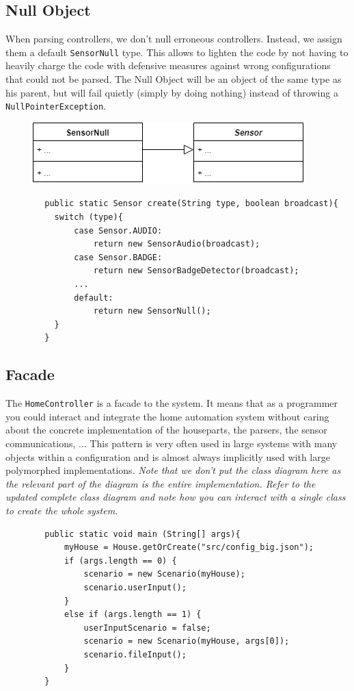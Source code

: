       \subsection{Null Object}
        When parsing controllers, we don't null erroneous controllers. Instead, we assign them a default \texttt{SensorNull} type. This allows to lighten the code by not having to heavily charge the code with defensive measures against wrong configurations that could not be parsed. The Null Object will be an object of the same type as his parent, but will fail quietly (simply by doing nothing) instead of throwing a \texttt{NullPointerException}.
        \begin{figure}[!h]
          \includegraphics[scale=0.75]{nullsensor.png}
        \end{figure}
        \begin{verbatim}
        public static Sensor create(String type, boolean broadcast){
          switch (type){
              case Sensor.AUDIO:
                  return new SensorAudio(broadcast);
              case Sensor.BADGE:
                  return new SensorBadgeDetector(broadcast);
              ...
              default:
                  return new SensorNull();
          }
        }
        \end{verbatim}
      \subsection{Facade}
        The \texttt{HomeController} is a facade to the system. It means that as a programmer you could interact and integrate the home automation system without caring about the concrete implementation of the houseparts, the parsers, the sensor communications, ... This pattern is very often used in large systems with many objects within a configuration and is almost always implicitly used with large polymorphed implementations. \emph{Note that we don't put the class diagram here as the relevant part of the diagram is the entire implementation. Refer to the updated complete class diagram and note how you can interact with a single class to create the whole system.}

        \begin{verbatim}
        public static void main (String[] args){
            myHouse = House.getOrCreate("src/config_big.json");
            if (args.length == 0) {
                scenario = new Scenario(myHouse);
                scenario.userInput();
            }
            else if (args.length == 1) {
                userInputScenario = false;
                scenario = new Scenario(myHouse, args[0]);
                scenario.fileInput();
            }
        }
        \end{verbatim}
